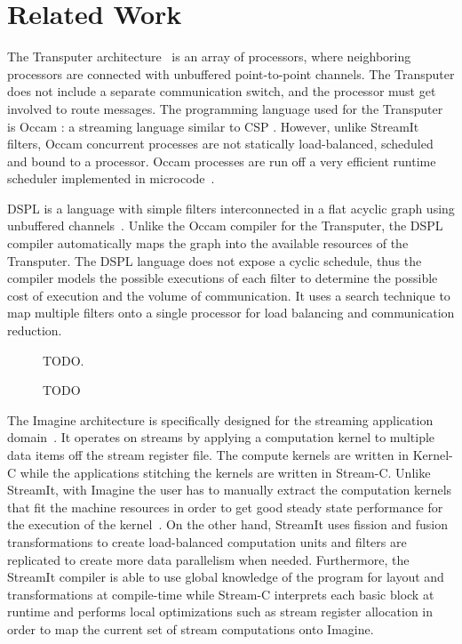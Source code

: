 \section{Related Work}
\label{sec:related}

The Transputer architecture~\cite{transputer88} is an array of
processors, where neighboring processors are connected with unbuffered
point-to-point channels.  The Transputer does not include a separate
communication switch, and the processor must get involved to route
messages.  The programming language used for the Transputer is Occam
\cite{occammanual}: a streaming language similar to CSP
\cite{Hoare78}.  However, unlike StreamIt filters, Occam concurrent
processes are not statically load-balanced, scheduled and bound to a
processor. Occam processes are run off a very efficient runtime
scheduler implemented in microcode~\cite{may87communicating}.

DSPL is a language with simple filters interconnected in a flat acyclic
graph using unbuffered channels~\cite{Thiel93}.  Unlike the Occam
compiler for the Transputer, the DSPL compiler automatically maps the
graph into the available resources of the Transputer. The DSPL language
does not expose a cyclic schedule, thus the compiler models the
possible executions of each filter to determine the possible cost of
execution and the volume of communication. It uses a search technique
to map multiple filters onto a single processor for load balancing and
communication reduction. 

\begin{figure}
\begin{minipage}{3.2in}
\centering
{}
\caption{TODO.
\protect\label{fig:opt-diagram}}
\end{minipage}
\hspace{0.1in}
\begin{minipage}{3.2in}
\centering
{}
\caption{TODO
\protect\label{fig:utilization-diagram}}
\end{minipage}
\end{figure}

The Imagine architecture is specifically designed for the streaming
application domain~\cite{rixner98bandwidthefficient}.  It operates on
streams by applying a computation kernel to multiple data items off
the stream register file.  The compute kernels are written in Kernel-C
while the applications stitching the kernels are written in Stream-C.
Unlike StreamIt, with Imagine the user has to manually extract the
computation kernels that fit the machine resources in order to get
good steady state performance for the execution of the
kernel~\cite{kapasi:2001:ss}.  On the other hand, StreamIt uses
fission and fusion transformations to create load-balanced computation
units and filters are replicated to create more data parallelism when
needed.  Furthermore, the StreamIt compiler is able to use global
knowledge of the program for layout and transformations at
compile-time while Stream-C interprets each basic block at runtime and
performs local optimizations such as stream register allocation in
order to map the current set of stream computations onto Imagine.

